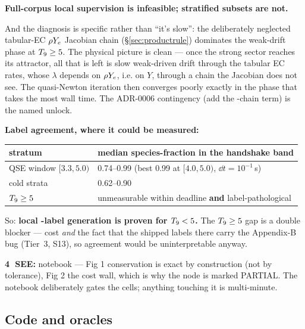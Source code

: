 \textbf{Full-corpus local \Phifl{} supervision is infeasible; stratified subsets
are not.}

And the diagnosis is specific rather than ``it's slow'': the deliberately
neglected tabular-EC $\rho Y_{e}$ Jacobian chain (\S\ref{sec:productrule})
dominates the weak-drift phase at $T_{9} \ge 5$. The physical picture is clean ---
once the strong sector reaches its attractor, all that is left is slow
weak-driven \Ye{} drift through the tabular EC rates, whose $\lambda$ depends on
$\rho Y_{e}$, i.e. on $Y$, through a chain the Jacobian does not see. The
quasi-Newton iteration then converges poorly exactly in the phase that takes the
most wall time. The ADR-0006 contingency (add the \Ye-chain term) is the named
unlock.

\textbf{Label agreement, where it could be measured:}

\begin{center}
\begin{tabularx}{\textwidth}{@{}L{4.6cm} Y@{}}
\toprule
\textbf{stratum} &
\textbf{median species-fraction in the handshake band} \\
\midrule
QSE window $[3.3, 5.0)$ & 0.74--0.99 (best 0.99 at $[4.0, 5.0)$,
  $\dd t = 10^{-1}$\,s) \\
cold strata & 0.62--0.90 \\
$T_{9} \ge 5$ & unmeasurable within deadline \textbf{and} label-pathological \\
\bottomrule
\end{tabularx}
\end{center}

So: \textbf{local \Phifl-label generation is proven for $T_{9} < 5$.} The
$T_{9} \ge 5$ gap is a double blocker --- cost \emph{and} the fact that the
shipped labels there carry the Appendix-B bug (Tier~3, S13), so agreement would
be uninterpretable anyway.

\begin{repopointer}
\textbf{\textcircled{4} SEE:} notebook 
--- Fig 1 conservation is exact by construction (not by tolerance), Fig 2 the
cost wall, which is why the node is marked PARTIAL. The notebook deliberately
gates the  cells; anything touching it is multi-minute.
\end{repopointer}

\subsection{Code and oracles}
\label{sec:codes10}

